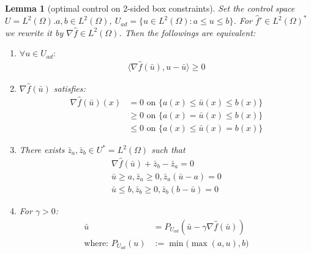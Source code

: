 \documentclass[a4paper,11pt,fleqn]{book}
\newtheorem{lemma}[theorem]{Lemma}
\theoremstyle{definition}
\theoremstyle{remark}
\begin{document}
\begin{lemma}[optimal control on 2-sided box constraints]
	Set the control space $U = L^2(\Omega)$.$a, b \in L^2(\Omega)$, $U_{ad} = \{u \in L^2(\Omega): a \le u \le b\}$.  For $\hat{f}' \in L^2(\Omega)^*$ we rewrite it by $\nabla \hat{f} \in L^2(\Omega)$. Then the followings are equivalent:
	\begin{enumerate}
		\item $\forall u \in U_{ad}:$
		\begin{align*}
			\langle \nabla \hat{f}(\bar{u}), u - \bar{u} \rangle \geq 0
		\end{align*}
		\item $\nabla \hat{f}(\bar{u})$ satisfies:
		\begin{align*}
			\nabla \hat{f}(\bar{u}) (x) 
			& = 0  \text{ on } \{a(x) \le \bar{u}(x) \le b(x)\}\\
			&\ge 0 \text{ on } \{a(x) = \bar{u}(x) \le b(x) \}\\
			&\le 0 \text{ on } \{a(x) \le \bar{u}(x) = b(x) \}
		\end{align*}
		\item There exists $\bar{z}_a,\bar{z}_b \in U^* = L^2(\Omega)$ such that 
		\begin{align*}
			\nabla \hat{f}(\bar{u}) + \bar{z}_b - \bar{z}_a = 0\\
			\bar{u} \ge a, \bar{z}_a \ge 0, \bar{z}_a (\bar{u} - a) = 0\\
			\bar{u} \le b, \bar{z}_b \ge 0, \bar{z}_b (b - \bar{u}) =0
		\end{align*}
		\item For $\gamma > 0$:
		\begin{align*}
			\bar{u} &= P_{U_{ad}} (\bar{u} - \gamma \nabla \hat{f}(\bar{u}))\\
			\text{where: } P_{U_{ad}}(u) &:= \min\bigg( \max(a, u), b\bigg)
		\end{align*}
	\end{enumerate}
\end{lemma}
\end{document}
